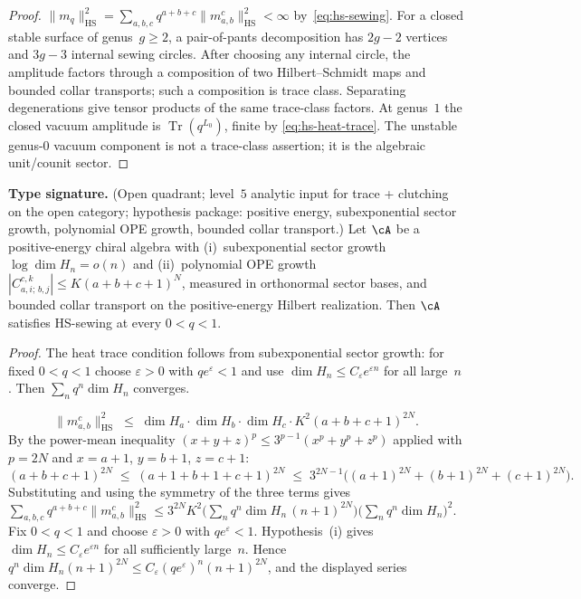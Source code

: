 \begin{proof}
$\|m_q\|_{\mathrm{HS}}^2 = \sum_{a,b,c} q^{a+b+c}
\|m_{a,b}^c\|_{\mathrm{HS}}^2 < \infty$ by~\eqref{eq:hs-sewing}.
For a closed stable surface of genus~$g\geq2$, a pair-of-pants
decomposition has $2g-2$ vertices and $3g-3$ internal sewing circles.
After choosing any internal circle, the amplitude factors through a
composition of two Hilbert--Schmidt maps and bounded collar
transports; such a composition is trace class. Separating degenerations
give tensor products of the same trace-class factors.  At genus~$1$
the closed vacuum amplitude is $\operatorname{Tr}(q^{L_0})$, finite by
\eqref{eq:hs-heat-trace}. The unstable genus-$0$ vacuum component is
not a trace-class assertion; it is the algebraic unit/counit sector.
\end{proof}

\begin{theorem}%
\label{thm:general-hs-sewing}%
%
\textbf{Type signature.} (Open quadrant; level~$5$ analytic input for
trace + clutching on the open category; hypothesis package: positive
energy, subexponential sector growth, polynomial OPE growth, bounded
collar transport.)
Let\/ $\cA$ be a positive-energy chiral algebra with
\textup{(i)}~subexponential sector growth $\log\dim H_n = o(n)$
and \textup{(ii)}~polynomial OPE growth
$|C^{c,k}_{a,i;\,b,j}| \leq K(a+b+c+1)^N$, measured in orthonormal
sector bases, and bounded collar transport on the positive-energy
Hilbert realization. Then $\cA$ satisfies HS-sewing at every
$0 < q < 1$.
\end{theorem}

\begin{proof}
The heat trace condition follows from subexponential sector growth:
for fixed $0<q<1$ choose $\varepsilon>0$ with $qe^\varepsilon<1$ and
use $\dim H_n\leq C_\varepsilon e^{\varepsilon n}$ for all large~$n$.
Then $\sum_n q^n\dim H_n$ converges.

\[
\|m_{a,b}^c\|_{\mathrm{HS}}^2
\;\leq\;
\dim H_a \cdot \dim H_b \cdot \dim H_c
\cdot K^2(a{+}b{+}c{+}1)^{2N}.
\]
By the power-mean inequality $(x+y+z)^p \leq 3^{p-1}(x^p + y^p + z^p)$
applied with $p = 2N$ and $x = a{+}1$, $y = b{+}1$, $z = c{+}1$:
\[
(a{+}b{+}c{+}1)^{2N} \;\leq\; (a{+}1 + b{+}1 + c{+}1)^{2N}
\;\leq\; 3^{2N-1}\bigl((a{+}1)^{2N} + (b{+}1)^{2N} + (c{+}1)^{2N}\bigr).
\]
Substituting and using the symmetry of the three terms gives
$\sum_{a,b,c} q^{a+b+c}\|m_{a,b}^c\|_{\mathrm{HS}}^2
\leq 3^{2N}K^2
\bigl(\sum_n q^n\dim H_n\,(n{+}1)^{2N}\bigr)
\bigl(\sum_n q^n\dim H_n\bigr)^2$.
Fix $0<q<1$ and choose $\varepsilon>0$ with
$qe^\varepsilon<1$.  Hypothesis~(i) gives
$\dim H_n\leq C_\varepsilon e^{\varepsilon n}$ for all sufficiently
large~$n$.  Hence
$q^n\dim H_n(n+1)^{2N}\leq
C_\varepsilon(qe^\varepsilon)^n(n+1)^{2N}$, and the displayed
series converge.
\end{proof}

